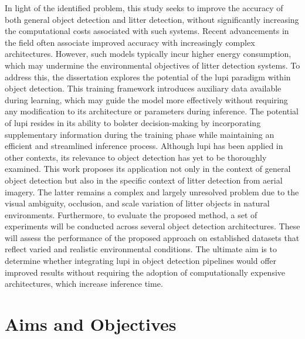 In light of the identified problem, this study seeks to improve the accuracy of both general object detection and litter detection, without significantly increasing the computational costs associated with such systems. Recent advancements in the field often associate improved accuracy with increasingly complex architectures. However, such models typically incur higher energy consumption, which may undermine the environmental objectives of litter detection systems.
To address this, the dissertation explores the potential of the \gls{lupi} paradigm within object detection. This training framework introduces auxiliary data available during learning, which may guide the model more effectively without requiring any modification to its architecture or parameters during inference. The potential of \gls{lupi} resides in its ability to bolster decision-making by incorporating supplementary information during the training phase while maintaining an efficient and streamlined inference process.
Although \gls{lupi} has been applied in other contexts, its relevance to object detection has yet to be thoroughly examined. This work proposes its application not only in the context of general object detection but also in the specific context of litter detection from aerial imagery. The latter remains a complex and largely unresolved problem due to the visual ambiguity, occlusion, and scale variation of litter objects in natural environments.
Furthermore, to evaluate the proposed method, a set of experiments will be conducted across several object detection architectures. These will assess the performance of the proposed approach on established datasets that reflect varied and realistic environmental conditions. The ultimate aim is to determine whether integrating \gls{lupi} in object detection pipelines would offer improved results without requiring the adoption of computationally expensive architectures, which increase inference time.

\section{Aims and Objectives}
\label{sec:aims}

